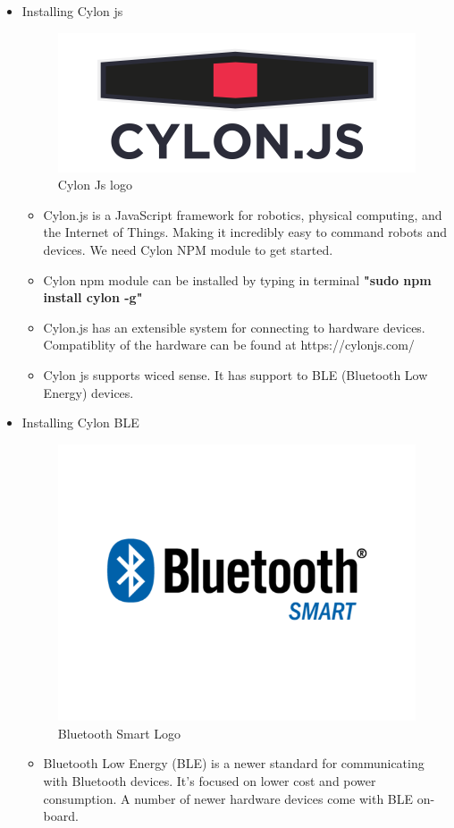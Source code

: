 \documentclass[11pt,a4paper]{article}
\begin{document}
\begin{itemize}
	\newpage
	\item Installing Cylon js
		 \begin{figure}[h]
    \centering
	\includegraphics[scale=0.3]{CylonJS.png}
	\caption{Cylon Js logo}
	\end{figure}
    \begin{itemize}
\item 	Cylon.js is a JavaScript framework for robotics, physical computing, and the Internet of Things. Making it incredibly easy to command robots and devices.
	We need Cylon NPM module to get started. 
	\item Cylon npm module can be installed by typing in terminal \textbf{"sudo npm install cylon -g"}
	\item Cylon.js has an extensible system for connecting to hardware devices. Compatiblity of the hardware can be found at https://cylonjs.com/
	\item Cylon js supports wiced sense. It has support to BLE (Bluetooth Low Energy) devices.
	\end{itemize}
	
	\item Installing Cylon BLE
	\begin{figure}[h]
    \centering
	\includegraphics[scale=0.25]{bluetooth-smart.png}
	\caption{Bluetooth Smart Logo}
	\end{figure}
	    \begin{itemize}  
	    \item Bluetooth Low Energy (BLE) is a newer standard for communicating with Bluetooth devices. It's focused on lower cost and power consumption. A number of newer hardware devices come with BLE on-board.


\end{itemize}
\end{itemize}
\end{document}
